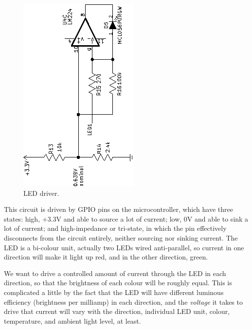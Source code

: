 \begin{figure}
{\centering\includegraphics[scale=2,rotate=-90]{opamp2.eps}\par}
\caption{LED driver.}\label{fig:led-driver}
\end{figure}

This circuit is driven by GPIO pins on the microcontroller, which have three
states:  high, $+$3.3V and able to source a lot of current; low,
0V and able to sink a lot of current; and high-impedance or tri-state, in
which the pin effectively disconnects from the circuit entirely, neither
sourcing nor sinking current.  The LED is a bi-colour unit, actually two
LEDs wired anti-parallel, so current in one direction will make it light up
red, and in the other direction, green.

We want to drive a controlled amount of current through the LED in each
direction, so that the brightness of each colour will be roughly equal. 
This is complicated a little by the fact that the LED will have different
luminous efficiency (brightness per milliamp) in each direction, and the
\emph{voltage} it takes to drive that current will vary with the direction,
individual LED unit, colour, temperature, and ambient light level, at least. 

